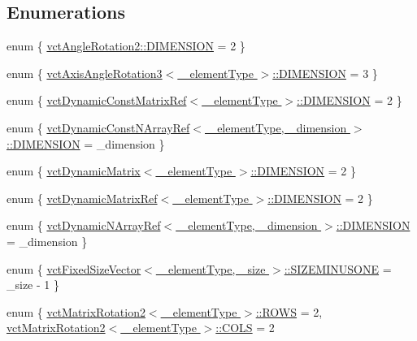 \subsection*{Enumerations}
\begin{DoxyCompactItemize}
\item 
enum \{ \hyperlink{group__cisst_vector_ggafbea62c89658b43900b288ac6f3981e6a511d05c6ad1614fcd0459444b62b4364}{vct\+Angle\+Rotation2\+::\+D\+I\+M\+E\+N\+S\+I\+O\+N} = 2
 \}
\item 
enum \{ \hyperlink{group__cisst_vector_gga278b4a98a62e4f5ff42ce055836240a9a778d22dfe29402d2cfdd381c1b870285}{vct\+Axis\+Angle\+Rotation3$<$ \+\_\+element\+Type $>$\+::\+D\+I\+M\+E\+N\+S\+I\+O\+N} = 3
 \}
\item 
enum \{ \hyperlink{group__cisst_vector_gga79a3214fbb027346f5ba60336c95c1faa078cb772f47aba74a3233d177914f8fa}{vct\+Dynamic\+Const\+Matrix\+Ref$<$ \+\_\+element\+Type $>$\+::\+D\+I\+M\+E\+N\+S\+I\+O\+N} = 2
 \}
\item 
enum \{ \hyperlink{group__cisst_vector_ggae8d52484153d181fd3ac08be58589848ae003ed9f88ed51f50c6c180506995b93}{vct\+Dynamic\+Const\+N\+Array\+Ref$<$ \+\_\+element\+Type, \+\_\+dimension $>$\+::\+D\+I\+M\+E\+N\+S\+I\+O\+N} = \+\_\+dimension
 \}
\item 
enum \{ \hyperlink{group__cisst_vector_gga20a06ac370f39d094a3249a08644471aa6b17aeb32aa45c3a75bad3506c9218dc}{vct\+Dynamic\+Matrix$<$ \+\_\+element\+Type $>$\+::\+D\+I\+M\+E\+N\+S\+I\+O\+N} = 2
 \}
\item 
enum \{ \hyperlink{group__cisst_vector_gga296ccb28efb27cc7c51864f9e81b77eca26570951ef99650f548cdec008ae4444}{vct\+Dynamic\+Matrix\+Ref$<$ \+\_\+element\+Type $>$\+::\+D\+I\+M\+E\+N\+S\+I\+O\+N} = 2
 \}
\item 
enum \{ \hyperlink{group__cisst_vector_gga92161a3e7a42576d3442eaf7bae097c1aa639cdab72a595c9cb324af98946bab5}{vct\+Dynamic\+N\+Array\+Ref$<$ \+\_\+element\+Type, \+\_\+dimension $>$\+::\+D\+I\+M\+E\+N\+S\+I\+O\+N} = \+\_\+dimension
 \}
\item 
enum \{ \hyperlink{group__cisst_vector_ggae684c096a8e0682238147d0cbc182cdeaa60fa332debc82a5c232c3330c14f4fd}{vct\+Fixed\+Size\+Vector$<$ \+\_\+element\+Type, \+\_\+size $>$\+::\+S\+I\+Z\+E\+M\+I\+N\+U\+S\+O\+N\+E} = \+\_\+size -\/ 1
 \}
\item 
enum \{ \hyperlink{group__cisst_vector_ggac2875a62bcfe1fb310808a4aff444120a405943de2af4c1dae37a90156248a41b}{vct\+Matrix\+Rotation2$<$ \+\_\+element\+Type $>$\+::\+R\+O\+W\+S} = 2, 
\hyperlink{group__cisst_vector_ggac2875a62bcfe1fb310808a4aff444120a3f895b9e3be292e80920a74194301b11}{vct\+Matrix\+Rotation2$<$ \+\_\+element\+Type $>$\+::\+C\+O\+L\+S} = 2

\end{DoxyCompactItemize}
